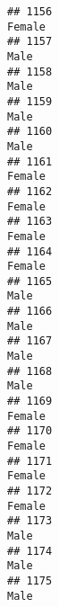 \documentclass[]{article}
\begin{document}
\begin{verbatim}
## 1156                                                                                                                          Female
## 1157                                                                                                                            Male
## 1158                                                                                                                            Male
## 1159                                                                                                                            Male
## 1160                                                                                                                            Male
## 1161                                                                                                                          Female
## 1162                                                                                                                          Female
## 1163                                                                                                                          Female
## 1164                                                                                                                          Female
## 1165                                                                                                                            Male
## 1166                                                                                                                            Male
## 1167                                                                                                                            Male
## 1168                                                                                                                            Male
## 1169                                                                                                                          Female
## 1170                                                                                                                          Female
## 1171                                                                                                                          Female
## 1172                                                                                                                          Female
## 1173                                                                                                                            Male
## 1174                                                                                                                            Male
## 1175                                                                                                                            Male

\end{verbatim}
\end{document}
